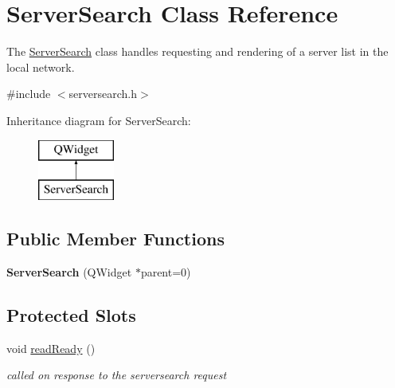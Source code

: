 \hypertarget{class_server_search}{\section{Server\-Search Class Reference}
\label{class_server_search}
}


The \hyperlink{class_server_search}{Server\-Search} class handles requesting and rendering of a server list in the local network.  




{\ttfamily \#include $<$serversearch.\-h$>$}

Inheritance diagram for Server\-Search\-:\begin{figure}[H]
\begin{center}
\leavevmode
\includegraphics[height=2.000000cm]{class_server_search}
\end{center}
\end{figure}
\subsection*{Public Member Functions}
\begin{DoxyCompactItemize}
\item 
\hypertarget{class_server_search_a53407c1f938da9f6850c4475f292d349}{{\bfseries Server\-Search} (Q\-Widget $\ast$parent=0)}\label{class_server_search_a53407c1f938da9f6850c4475f292d349}

\end{DoxyCompactItemize}
\subsection*{Protected Slots}
\begin{DoxyCompactItemize}
\item 
\hypertarget{class_server_search_a5f0aa647331b434da9e9346100448211}{void \hyperlink{class_server_search_a5f0aa647331b434da9e9346100448211}{read\-Ready} ()}\label{class_server_search_a5f0aa647331b434da9e9346100448211}

\begin{DoxyCompactList}\small\item\em called on response to the serversearch request \end{DoxyCompactList}\end{DoxyCompactItemize}
